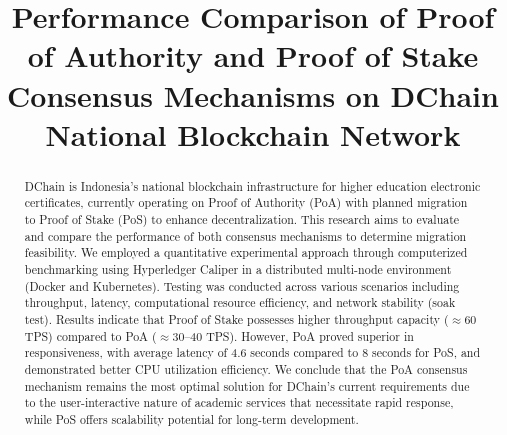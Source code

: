 \documentclass[conference]{IEEEtran}
\begin{document}
\title{Performance Comparison of Proof of Authority and Proof of Stake Consensus Mechanisms on DChain National Blockchain Network}

\author{%
	\and
	\and
}

\maketitle

\begin{abstract}
DChain is Indonesia's national blockchain infrastructure for higher education electronic certificates, currently operating on Proof of Authority (PoA) with planned migration to Proof of Stake (PoS) to enhance decentralization. This research aims to evaluate and compare the performance of both consensus mechanisms to determine migration feasibility. We employed a quantitative experimental approach through computerized benchmarking using Hyperledger Caliper in a distributed multi-node environment (Docker and Kubernetes). Testing was conducted across various scenarios including throughput, latency, computational resource efficiency, and network stability (soak test). Results indicate that Proof of Stake possesses higher throughput capacity ($\approx$60 TPS) compared to PoA ($\approx$30--40 TPS). However, PoA proved superior in responsiveness, with average latency of 4.6 seconds compared to 8 seconds for PoS, and demonstrated better CPU utilization efficiency. We conclude that the PoA consensus mechanism remains the most optimal solution for DChain's current requirements due to the user-interactive nature of academic services that necessitate rapid response, while PoS offers scalability potential for long-term development.
\end{abstract}
\end{document}
